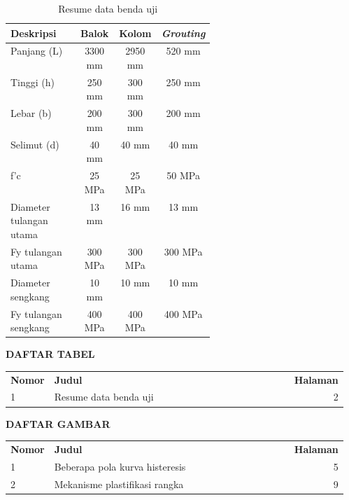\begin{singlespace}
\setlength{\tabcolsep}{10pt}
\begin{longtable}{|p{0.34\linewidth}|c|c|c|}
\caption{Resume data benda uji}\\
\hline
\textbf{Deskripsi} & \textbf{Balok} & \textbf{Kolom} & \textbf{\textit{Grouting}} \\
\hline
Panjang (L) & 3300 mm & 2950 mm & 520 mm \\
\hline
Tinggi (h) & 250 mm & 300 mm & 250 mm \\
\hline
Lebar (b) & 200 mm & 300 mm & 200 mm \\
\hline
Selimut (d) & 40 mm & 40 mm & 40 mm \\
\hline
f’c & 25 MPa & 25 MPa & 50 MPa \\
\hline
Diameter tulangan utama & 13 mm & 16 mm & 13 mm \\
\hline
Fy tulangan utama & 300 MPa & 300 MPa & 300 MPa \\
\hline
Diameter sengkang & 10 mm & 10 mm & 10 mm \\
\hline
Fy tulangan sengkang & 400 MPa & 400 MPa & 400 MPa \\
\hline

\end{longtable}
\end{singlespace}

\begin{tengah}
\textbf{DAFTAR TABEL}
\end{tengah}
\begin{tanpagaris}
\begin{longtable}{@{}p{0.13\linewidth}p{0.67\linewidth}r@{}}
\textbf{Nomor} & \textbf{Judul} & \textbf{Halaman} \\
1 & Resume data benda uji & 2 \\
\end{longtable}
\end{tanpagaris}

\begin{tengah}
\textbf{DAFTAR GAMBAR}
\end{tengah}
\begin{tanpagaris}
\begin{longtable}{@{}p{0.13\linewidth}p{0.67\linewidth}r@{}}
\textbf{Nomor} & \textbf{Judul} & \textbf{Halaman} \\
1 & Beberapa pola kurva histeresis & 5 \\
2 & Mekanisme plastifikasi rangka & 9 \\
\end{longtable}
\end{tanpagaris}

